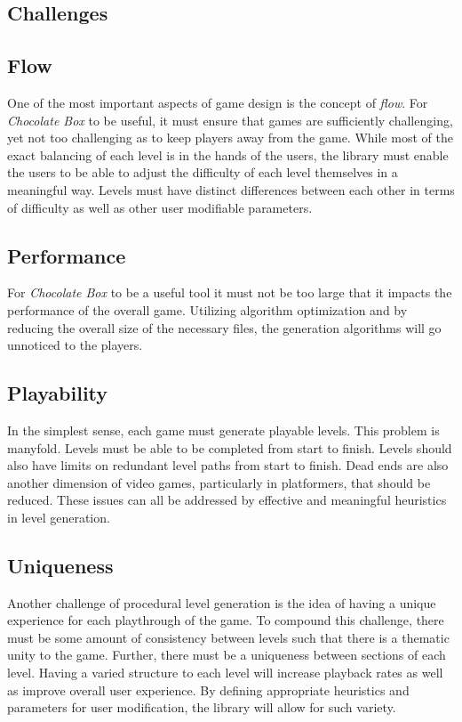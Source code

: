\documentclass[pdftex,12pt,letter]{article}
\begin{document}
\begin{itemize}
\begin{itemize}
\begin{itemize}
\section{Challenges}
\subsection{Flow}
One of the most important aspects of game design is the concept of \textit{flow}.  For \textit{Chocolate Box} to be useful, it must ensure that games are sufficiently challenging, yet not too challenging as to keep players away from the game. While most of the  exact balancing of each level is in the hands of the users, the library must enable the users to be able to adjust the difficulty of each level themselves in a meaningful way. Levels must have distinct differences between each other in terms of difficulty as well as other user modifiable parameters. 
\subsection{Performance}
For \textit{Chocolate Box} to be a useful tool it must not be too large that it impacts the performance of the overall game. Utilizing algorithm optimization and by reducing the overall size of the necessary files, the generation algorithms will go unnoticed to the players. 
\subsection{Playability}
In the simplest sense, each game must generate playable levels. This problem is manyfold. Levels must be able to be completed from start to finish. Levels should also have limits on redundant level paths from start to finish. Dead ends are also another dimension of video games, particularly in platformers, that should be reduced. These issues can all be addressed by effective and meaningful heuristics in level generation.
\subsection{Uniqueness}
Another challenge of procedural level generation is the idea of having a unique experience for each playthrough of the game. To compound this challenge, there must be some amount of consistency between levels such that there is a thematic unity to the game. Further, there must be a uniqueness between sections of each level. Having a varied structure to each level will increase playback rates as well as improve overall user experience. By defining appropriate heuristics and parameters for user modification, the library will allow for such variety. 

\end{itemize}
\end{itemize}
\end{itemize}
\end{document}
